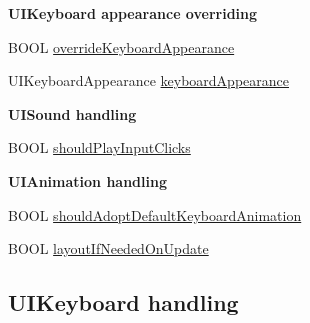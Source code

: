 \begin{Indent}\textbf{ U\+I\+Keyboard appearance overriding}\par
{\em 

 

 }\begin{DoxyCompactItemize}
\item 
B\+O\+OL \mbox{\hyperlink{interface_i_q_keyboard_manager_ae63559b4887df822b3937f340ed57e1f}{override\+Keyboard\+Appearance}}
\item 
U\+I\+Keyboard\+Appearance \mbox{\hyperlink{interface_i_q_keyboard_manager_a049825b2237a1079a17067301e8fa8f7}{keyboard\+Appearance}}
\end{DoxyCompactItemize}
\end{Indent}
\begin{Indent}\textbf{ U\+I\+Sound handling}\par
{\em 

 

 }\begin{DoxyCompactItemize}
\item 
B\+O\+OL \mbox{\hyperlink{interface_i_q_keyboard_manager_a4fbd8694623e39aef0a72b8c28324274}{should\+Play\+Input\+Clicks}}
\end{DoxyCompactItemize}
\end{Indent}
\begin{Indent}\textbf{ U\+I\+Animation handling}\par
{\em 

 

 }\begin{DoxyCompactItemize}
\item 
B\+O\+OL \mbox{\hyperlink{interface_i_q_keyboard_manager_aaf68e370538804a4b039771e03ec521f}{should\+Adopt\+Default\+Keyboard\+Animation}}
\item 
B\+O\+OL \mbox{\hyperlink{interface_i_q_keyboard_manager_aeed424f5d0346574879c1e48ee686362}{layout\+If\+Needed\+On\+Update}}
\end{DoxyCompactItemize}
\end{Indent}
\subsection*{U\+I\+Keyboard handling}
\label{_amgrpd54ca24730814e06c8eb297347101945}%


 

